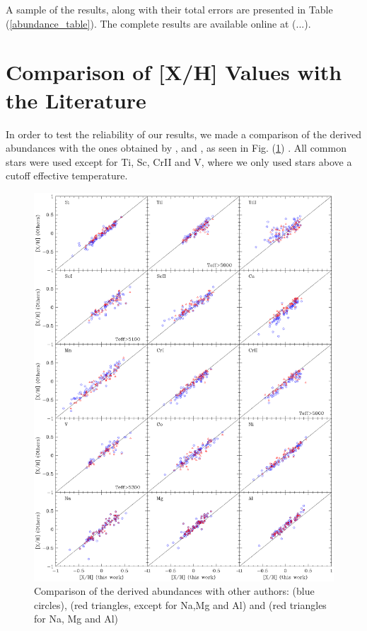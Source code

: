\documentclass[dvips,12pt,a4paper]{report}
\begin{document}
{{A sample of the results, along with their total errors are presented in Table (\ref{abundance_table}). The complete results are available online at (...). 

\section{Comparison of [X/H] Values with the Literature}

In order to test the reliability of our results, we made a comparison of the derived abundances with the ones obtained by \citet{Gilli-2006}, \citet{Bodaghee-2003} and \citet{Beirao-2005}, as seen in Fig. (\ref{gfxcomparison}) . All common stars were used except for Ti, Sc, CrII and V, where we only used stars above a cutoff effective temperature.

\begin{figure}[h]
\centering
\includegraphics[width=16 cm, height=15 cm]{pics/parte4/comp.eps}
\caption[Comparison of abundances with other authors]{Comparison of the derived abundances with other authors: \citet{Gilli-2006} (blue circles), \citet{Bodaghee-2003} (red triangles, except for Na,Mg and Al) and \citet{Beirao-2005} (red triangles for Na, Mg and Al)  }
\label{gfxcomparison}
\end{figure}



}}
\end{document}
